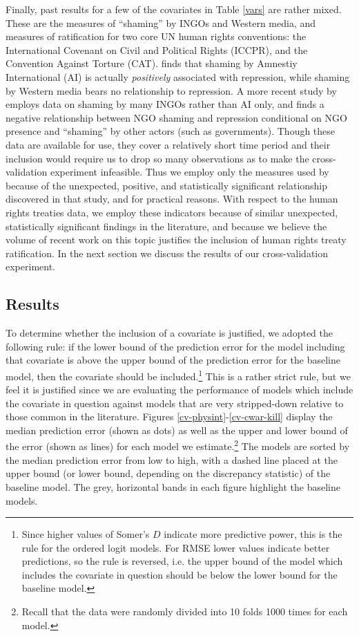 \documentclass[12pt]{article}
\begin{document}
Finally, past results for a few of the covariates in Table \ref{vars} are rather mixed. These are the measures of ``shaming'' by INGOs and Western media, and measures of ratification for two core UN human rights conventions: the International Covenant on Civil and Political Rights (ICCPR), and the Convention Against Torture (CAT). \citet{HafnerBurton2008} finds that shaming by Amnestiy International (AI) is actually {\it positively} associated with repression, while shaming by Western media bears no relationship to repression. A more recent study by \citet{MurdieDavis2012} employs data on shaming by many INGOs rather than AI only, and finds a negative relationship between NGO shaming and repression conditional on NGO presence and ``shaming'' by other actors (such as governments). Though these data are available for use, they cover a relatively short time period and their inclusion would require us to drop so many observations as to make the cross-validation experiment infeasible. Thus we employ only the measures used by \citet{HafnerBurton2008} because of the unexpected, positive, and statistically significant relationship discovered in that study, and for practical reasons. With respect to the human rights treaties data, we employ these indicators because of similar unexpected, statistically significant findings in the literature, and because we believe the volume of recent work on this topic justifies the inclusion of human rights treaty ratification. In the next section we discuss the results of our cross-validation experiment.

\subsection{Results}

To determine whether the inclusion of a covariate is justified, we adopted the following rule: if the lower bound of the prediction error for the model including that covariate is above the upper bound of the prediction error for the baseline model, then the covariate should be included.\footnote{Since higher values of Somer's $D$ indicate more predictive power, this is the rule for the ordered logit models. For RMSE lower values indicate better predictions, so the rule is reversed, i.e. the upper bound of the model which includes the covariate in question should be below the lower bound for the baseline model.} This is a rather strict rule, but we feel it is justified since we are evaluating the performance of models which include the covariate in question against models that are very stripped-down relative to those common in the literature. Figures \ref{cv-physint}-\ref{cv-cwar-kill} display the median prediction error (shown as dots) as well as the upper and lower bound of the error (shown as lines) for each model we estimate.\footnote{Recall that the data were randomly divided into 10 folds 1000 times for each model.} The models are sorted by the median prediction error from low to high, with a dashed line placed at the upper bound (or lower bound, depending on the discrepancy statistic) of the baseline model. The grey, horizontal bands in each figure highlight the baseline models. 
\end{document}
